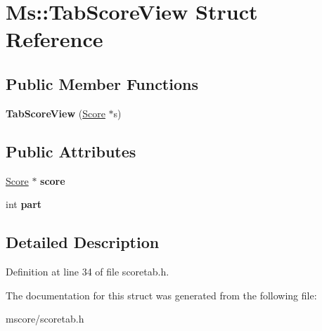 \hypertarget{struct_ms_1_1_tab_score_view}{}\section{Ms\+:\+:Tab\+Score\+View Struct Reference}
\label{struct_ms_1_1_tab_score_view}
\subsection*{Public Member Functions}
\begin{DoxyCompactItemize}
\item 
\mbox{\label{struct_ms_1_1_tab_score_view_adebc4d0314628bbdcda2bfb12095be93}} 
{\bfseries Tab\+Score\+View} (\hyperlink{class_ms_1_1_score}{Score} $\ast$s)
\end{DoxyCompactItemize}
\subsection*{Public Attributes}
\begin{DoxyCompactItemize}
\item 
\mbox{\label{struct_ms_1_1_tab_score_view_a567c723b0205c9fe33e0671e60425ee0}} 
\hyperlink{class_ms_1_1_score}{Score} $\ast$ {\bfseries score}
\item 
\mbox{\label{struct_ms_1_1_tab_score_view_afbb3c0deac2a852d9dee252e52eb0480}} 
int {\bfseries part}
\end{DoxyCompactItemize}


\subsection{Detailed Description}


Definition at line 34 of file scoretab.\+h.



The documentation for this struct was generated from the following file\+:\begin{DoxyCompactItemize}
\item 
mscore/scoretab.\+h\end{DoxyCompactItemize}
